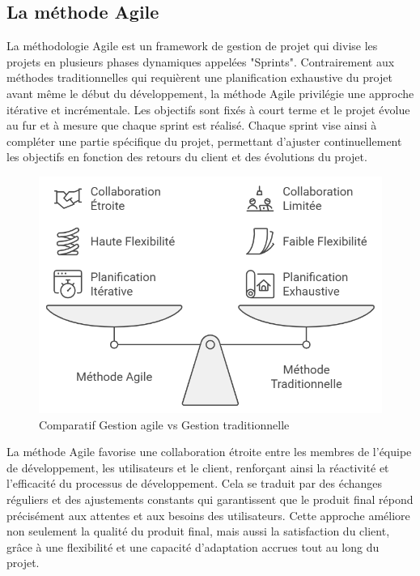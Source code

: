 {\subsection*{La méthode Agile}
La méthodologie Agile est un framework de gestion de projet qui divise les projets en plusieurs phases dynamiques appelées "Sprints". Contrairement aux méthodes traditionnelles qui requièrent une planification exhaustive du projet avant même le début du développement, la méthode Agile privilégie une approche itérative et incrémentale. Les objectifs sont fixés à court terme et le projet évolue au fur et à mesure que chaque sprint est réalisé. Chaque sprint vise ainsi à compléter une partie spécifique du projet, permettant d’ajuster continuellement les objectifs en fonction des retours du client et des évolutions du projet.

\vspace{0.3cm}

\begin{figure}[H]
\begin{center}
\includegraphics[width=15cm]{assets/presentation/1_gestion_agile_vs_gestion_traditionnelle.png}
\end{center}
\caption{Comparatif Gestion agile vs Gestion traditionnelle}
\end{figure}

La méthode Agile favorise une collaboration étroite entre les membres de l’équipe de développement, les utilisateurs et le client, renforçant ainsi la réactivité et l’efficacité du processus de développement. Cela se traduit par des échanges réguliers et des ajustements constants qui garantissent que le produit final répond précisément aux attentes et aux besoins des utilisateurs. Cette approche améliore non seulement la qualité du produit final, mais aussi la satisfaction du client, grâce à une flexibilité et une capacité d’adaptation accrues tout au long du projet. 

}
